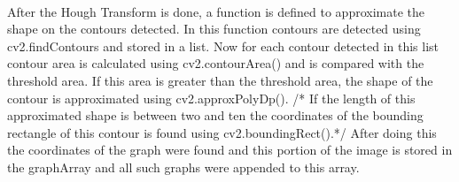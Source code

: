 \documentclass[a4paper,10pt]{scrreprt}
\begin{document}
\paragraph{}
After the Hough Transform is done, a function is defined to approximate the shape on the contours detected. In this function contours are detected using cv2.findContours and stored in a list. Now for each contour detected in this list contour area is calculated using cv2.contourArea() and is compared with the threshold area. If this area is greater than the threshold area, the shape of the contour is approximated using cv2.approxPolyDp(). /* If the length of this approximated shape is between two and ten the coordinates of the bounding rectangle of this contour is found using cv2.boundingRect().*/ After doing this the coordinates of the graph were found and this portion of the image is stored in the graphArray and all such graphs were appended to this array.
\end{document}
